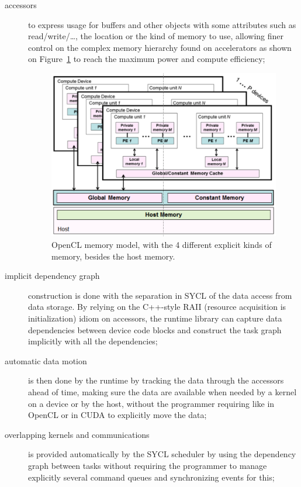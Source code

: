 \documentclass[sigplan]{acmart}
\begin{document}
\begin{description}
\item[accessors] to express usage for buffers and other objects with
  some attributes such as read/write/\ldots, the location or the kind
  of memory to use, allowing finer control on the complex memory
  hierarchy found on accelerators as shown on
  Figure~\ref{fig:OpenCL-memory-model} to reach the maximum power and
  compute efficiency;

  \begin{figure}
    \includegraphics[width=\hsize]{figures/memory-model}
    \caption{OpenCL memory model, with the 4 different explicit kinds
      of memory, besides the host memory.}
    \label{fig:OpenCL-memory-model}
  \end{figure}

\item[implicit dependency graph] construction is done with the
  separation in SYCL of the data access from data storage. By relying
  on the C++-style RAII (resource acquisition is initialization) idiom
  on accessors, the runtime library can capture data dependencies
  between device code blocks and construct the task graph implicitly
  with all the dependencies;

\item[automatic data motion] is then done by the runtime by tracking
  the data through the accessors ahead of time, making sure the data
  are available when needed by a kernel on a device or by the host,
  without the programmer requiring like in OpenCL or in CUDA to
  explicitly move the data;

\item[overlapping kernels and communications] is provided
  automatically by the SYCL scheduler by using the dependency graph
  between tasks without requiring the programmer to manage explicitly
  several command queues and synchronizing events for this;


\end{description}
\end{document}

